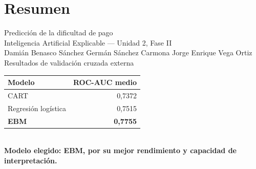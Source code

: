 \documentclass[aspectratio=169,10pt]{beamer}
\begin{document}
\section{Resumen}
\begin{frame}
  \vspace{.35cm}
  \begin{center}
    {\LARGE Predicción de la dificultad de pago}\\[.22cm]
    {\normalsize Inteligencia Artificial Explicable --- Unidad 2, Fase II}\\[.35cm]
    {\small Damián Benasco Sánchez \quad Germán Sánchez Carmona \quad Jorge Enrique Vega Ortiz}\\[.6cm]

    {\large Resultados de validación cruzada externa}\\[.15cm]
    \renewcommand{\arraystretch}{1.45}
    \begin{tabular}{@{}lr@{}}
      \toprule
      Modelo & ROC-AUC medio \\
      \midrule
      CART & 0,7372 \\
      Regresión logística & 0,7515 \\
      \textbf{EBM} & \textbf{0,7755} \\
      \bottomrule
    \end{tabular}\\[.42cm]
    \textbf{Modelo elegido: EBM, por su mejor rendimiento y capacidad de interpretación.}
  \end{center}
\end{frame}

\end{document}
